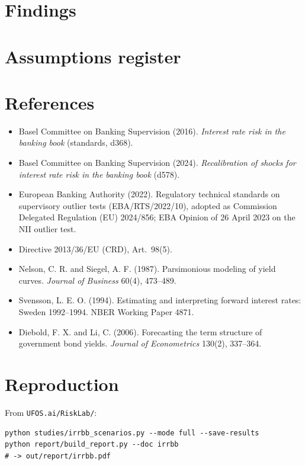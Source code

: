 \documentclass[11pt,a4paper]{article}
\begin{document}
\section{Findings}


\section{Assumptions register}


\section*{References}
\begin{itemize}
\item Basel Committee on Banking Supervision (2016). \emph{Interest rate risk in the banking book} (standards, d368).
\item Basel Committee on Banking Supervision (2024). \emph{Recalibration of shocks for interest rate risk in the
  banking book} (d578).
\item European Banking Authority (2022). Regulatory technical standards on supervisory outlier tests
  (EBA/RTS/2022/10), adopted as Commission Delegated Regulation (EU) 2024/856; EBA Opinion of 26 April 2023 on the
  NII outlier test.
\item Directive 2013/36/EU (CRD), Art.~98(5).
\item Nelson, C. R. and Siegel, A. F. (1987). Parsimonious modeling of yield curves. \emph{Journal of Business}
  60(4), 473--489.
\item Svensson, L. E. O. (1994). Estimating and interpreting forward interest rates: Sweden 1992--1994. NBER
  Working Paper 4871.
\item Diebold, F. X. and Li, C. (2006). Forecasting the term structure of government bond yields. \emph{Journal of
  Econometrics} 130(2), 337--364.
\end{itemize}

\appendix
\section{Reproduction}
From \texttt{UFOS.ai/RiskLab/}:
\begin{verbatim}
python studies/irrbb_scenarios.py --mode full --save-results
python report/build_report.py --doc irrbb
# -> out/report/irrbb.pdf
\end{verbatim}
\end{document}
